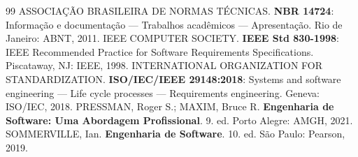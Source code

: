 \documentclass[
	12pt,
	oneside,
	a4paper,
	brazilian
]{abntex2}
\begin{document}
\clearpage
\begin{thebibliography}{99}
	 ASSOCIAÇÃO BRASILEIRA DE NORMAS TÉCNICAS. \textbf{NBR 14724}: Informação e documentação — Trabalhos acadêmicos — Apresentação. Rio de Janeiro: ABNT, 2011.
	 IEEE COMPUTER SOCIETY. \textbf{IEEE Std 830-1998}: IEEE Recommended Practice for Software Requirements Specifications. Piscataway, NJ: IEEE, 1998.
	 INTERNATIONAL ORGANIZATION FOR STANDARDIZATION. \textbf{ISO/IEC/IEEE 29148:2018}: Systems and software engineering — Life cycle processes — Requirements engineering. Geneva: ISO/IEC, 2018.
	 PRESSMAN, Roger S.; MAXIM, Bruce R. \textbf{Engenharia de Software: Uma Abordagem Profissional}. 9. ed. Porto Alegre: AMGH, 2021.
	 SOMMERVILLE, Ian. \textbf{Engenharia de Software}. 10. ed. São Paulo: Pearson, 2019.
\end{thebibliography}
\end{document}
